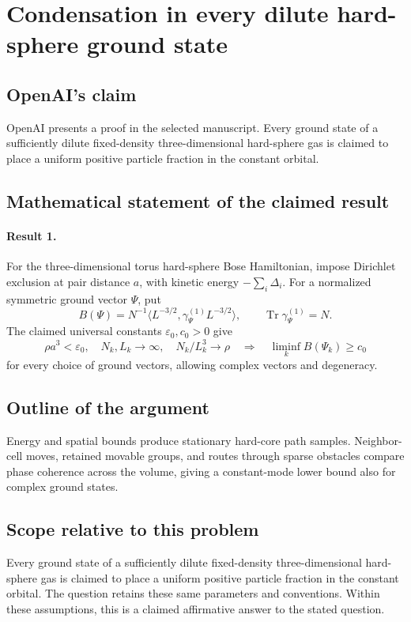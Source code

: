 \documentclass[11pt]{article}
\begin{document}
\section*{Condensation in every dilute hard-sphere ground state}

\subsection{OpenAI's claim}
OpenAI presents a proof in the selected manuscript. Every ground state of a sufficiently dilute fixed-density three-dimensional hard-sphere gas is claimed to place a uniform positive particle fraction in the constant orbital.

\subsection{Mathematical statement of the claimed result}
\paragraph{Result 1.} For the three-dimensional torus hard-sphere Bose Hamiltonian, impose Dirichlet exclusion at pair distance \(a\), with kinetic energy \(-\sum_i\Delta_i\). For a normalized symmetric ground vector \(\Psi\), put
\[
 B(\Psi)=N^{-1}\langle L^{-3/2},\gamma^{(1)}_\Psi L^{-3/2}\rangle,
 \qquad\operatorname{Tr}\gamma^{(1)}_\Psi=N.
\]
The claimed universal constants \(\varepsilon_0,c_0>0\) give
\[
 \rho a^3<\varepsilon_0,\quad N_k,L_k\to\infty,\quad N_k/L_k^3\to\rho
 \quad\Longrightarrow\quad\liminf_k B(\Psi_k)\ge c_0
\]
for every choice of ground vectors, allowing complex vectors and degeneracy.

\subsection{Outline of the argument}
Energy and spatial bounds produce stationary hard-core path samples. Neighbor-cell moves, retained movable groups, and routes through sparse obstacles compare phase coherence across the volume, giving a constant-mode lower bound also for complex ground states.

\subsection{Scope relative to this problem}
Every ground state of a sufficiently dilute fixed-density three-dimensional hard-sphere gas is claimed to place a uniform positive particle fraction in the constant orbital. The question retains these same parameters and conventions. Within these assumptions, this is a claimed affirmative answer to the stated question.
\end{document}
